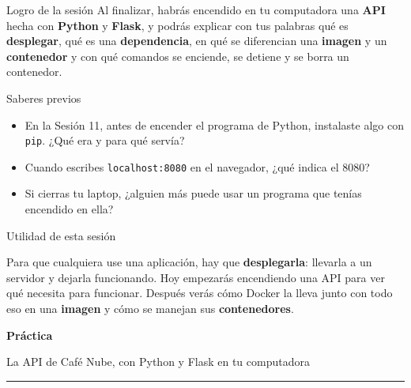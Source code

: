 \documentclass[aspectratio=169,10pt,c]{beamer}
\newcommand{\separador}[2]{%
\begin{frame}[plain]
\vfill
\begin{center}
{\fontsize{29}{34}\selectfont\bfseries #1}\par
\vspace{2mm}
{\small #2}\par
\vspace{4mm}
{\color{utpRojo}\rule{8.5cm}{1.2pt}}
\end{center}
\vfill
\end{frame}}
\begin{document}
\begin{frame}[c]
\begin{block}{Logro de la sesión}
Al finalizar, habrás encendido en tu computadora una \textbf{API} hecha con \textbf{Python} y \textbf{Flask}, y podrás explicar con tus palabras qué es \textbf{desplegar}, qué es una \textbf{dependencia}, en qué se diferencian una \textbf{imagen} y un \textbf{contenedor} y con qué comandos se enciende, se detiene y se borra un contenedor.
\end{block}
\end{frame}

\begin{frame}{Saberes previos}
\begin{itemize}\setlength\itemsep{14pt}
  \item En la Sesión 11, antes de encender el programa de Python, instalaste algo con \texttt{pip}. ¿Qué era y para qué servía?
  \item Cuando escribes \texttt{localhost:8080} en el navegador, ¿qué indica el 8080?
  \item Si cierras tu laptop, ¿alguien más puede usar un programa que tenías encendido en ella?
\end{itemize}
\end{frame}

\begin{frame}[c]{Utilidad de esta sesión}
\begin{center}
\begin{minipage}{.84\textwidth}
{\large Para que cualquiera use una aplicación, hay que \textbf{desplegarla}: llevarla a un servidor y dejarla funcionando. Hoy empezarás encendiendo una API para ver qué necesita para funcionar. Después verás cómo Docker la lleva junto con todo eso en una \textbf{imagen} y cómo se manejan sus \textbf{contenedores}.}
\end{minipage}
\end{center}
\end{frame}

\separador{Práctica}{La API de Café Nube, con Python y Flask en tu computadora}
\end{document}
